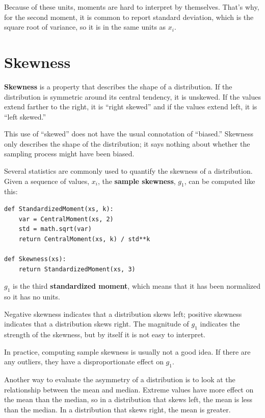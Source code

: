 \documentclass[12pt]{book}
\begin{document}
Because of these units, moments are hard to interpret by themselves.
That's why, for the second moment, it is common to report standard
deviation, which is the square root of variance, so it is in the same
units as $x_i$.


\section{Skewness}

{\bf Skewness} is a property that describes the shape of a distribution.
If the distribution is symmetric around its central tendency, it is
unskewed.  If the values extend farther to the right, it is ``right
skewed'' and if the values extend left, it is ``left skewed.''

This use of ``skewed'' does not have the usual connotation of
``biased.''  Skewness only describes the shape of the distribution;
it says nothing about whether the sampling process might have been
biased.

Several statistics are commonly used to quantify the skewness of a
distribution.  Given a sequence of values, $x_i$, the {\bf sample
  skewness}, $g_1$, can be computed like this:

\begin{verbatim}
def StandardizedMoment(xs, k):
    var = CentralMoment(xs, 2)
    std = math.sqrt(var)
    return CentralMoment(xs, k) / std**k

def Skewness(xs):
    return StandardizedMoment(xs, 3)
\end{verbatim}

$g_1$ is the third {\bf standardized moment}, which means that it has
been normalized so it has no units.

Negative skewness indicates that a distribution 
skews left; positive skewness indicates
that a distribution skews right.  The magnitude of $g_1$ indicates
the strength of the skewness, but by itself it is not easy to
interpret.

In practice, computing sample skewness is usually not
a good idea.  If there are any outliers, they
have a disproportionate effect on $g_1$.

Another way to evaluate the asymmetry of a distribution is to look
at the relationship between the mean and median.
Extreme values have more effect on the mean than the median, so
in a distribution that skews left, the mean is less than the median.
In a distribution that skews right, the mean is greater.
\end{document}
